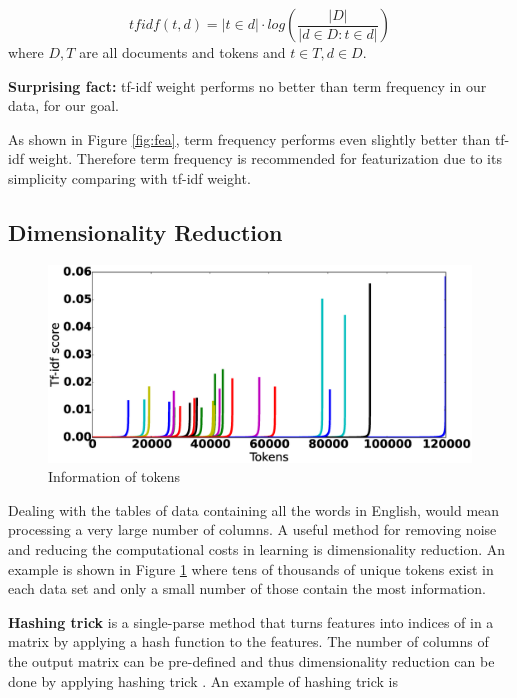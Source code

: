 \documentclass{sig-alternate-05-2015}
\begin{document}
\[\mathit{tfidf}(t, d) = |t  \in d| \cdot  log\left(\frac{|D|}{|d\in D: t\in d|}\right)\]
where $D,T$ are all documents and tokens and $t\in T,d\in D$.


\textbf{Surprising fact:} tf-idf weight performs no better than term frequency in our data, for our goal. 

As shown in Figure \ref{fig:fea}, term frequency performs even slightly better than tf-idf weight. Therefore term frequency is recommended for featurization due to its simplicity comparing with tf-idf weight.

\subsection{Dimensionality Reduction}

\begin{figure}[ht]
  \includegraphics[width=\linewidth]{./fig/tokens.eps}
  \caption{Information of tokens}
  \label{fig:tokens}
\end{figure}

Dealing with the tables of data containing all the words in English, would mean processing a very large number of columns. A useful method for removing noise and reducing the computational costs in learning is dimensionality reduction. An example is shown in Figure \ref{fig:tokens} where tens of thousands of unique tokens exist in each data set and only a small number of those contain the most information. 

\textbf{Hashing trick} is a single-parse method that turns features into indices of in a matrix by applying a hash function to the features. The number of columns of the output matrix can be pre-defined and thus dimensionality reduction can be done by applying hashing trick \cite{weinberger2009feature}. An example of hashing trick is
\end{document}
